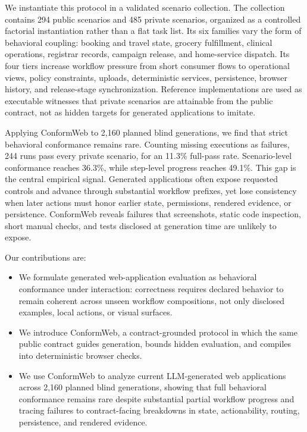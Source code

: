 We instantiate this protocol in a validated scenario collection. The collection
contains 294 public scenarios and 485 private scenarios, organized as a
controlled factorial instantiation rather than a flat task list. Its six
families vary the form of behavioral coupling: booking and travel state,
grocery fulfillment, clinical operations, registrar records, campaign release,
and home-service dispatch. Its four tiers increase workflow pressure from
short consumer flows to operational views, policy constraints, uploads,
deterministic services, persistence, browser history, and release-stage
synchronization. Reference implementations are used as executable witnesses
that private scenarios are attainable from the public contract, not as hidden
targets for generated applications to imitate.

Applying ConformWeb to 2,160 planned blind generations, we find that strict
behavioral conformance remains rare. Counting missing executions as failures,
244 runs pass every private scenario, for an 11.3\% full-pass rate.
Scenario-level conformance reaches 36.3\%, while step-level progress reaches
49.1\%. This gap is the central empirical signal. Generated applications often
expose requested controls and advance through substantial workflow prefixes,
yet lose consistency when later actions must honor earlier state, permissions,
rendered evidence, or persistence. ConformWeb reveals failures that screenshots,
static code inspection, short manual checks, and tests disclosed at generation
time are unlikely to expose.

Our contributions are:
\begin{itemize}
    \item We formulate generated web-application evaluation as behavioral
    conformance under interaction: correctness requires declared behavior to
    remain coherent across unseen workflow compositions, not only disclosed
    examples, local actions, or visual surfaces.

    \item We introduce ConformWeb, a contract-grounded protocol in which the
    same public contract guides generation, bounds hidden evaluation, and
    compiles into deterministic browser checks.

    \item We use ConformWeb to analyze current LLM-generated web applications
    across 2,160 planned blind generations, showing that full behavioral
    conformance remains rare despite substantial partial workflow progress and
    tracing failures to contract-facing breakdowns in state, actionability,
    routing, persistence, and rendered evidence.
\end{itemize}


